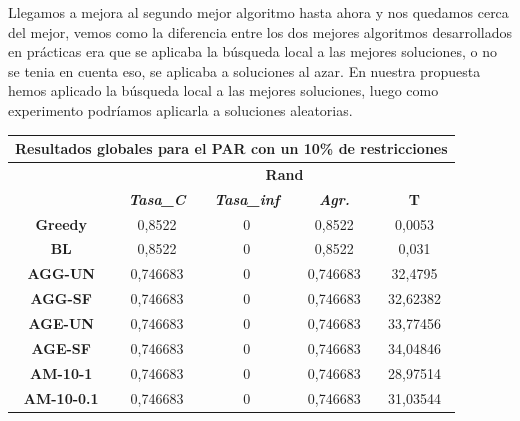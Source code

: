 \documentclass[12pt, spanish]{article}
\begin{document}
Llegamos a mejora al segundo mejor algoritmo hasta ahora y nos quedamos cerca del mejor, vemos como la diferencia entre los dos mejores algoritmos desarrollados en prácticas era que se aplicaba la búsqueda local a las mejores soluciones, o no se tenia en cuenta eso, se aplicaba a soluciones al azar. En nuestra propuesta hemos aplicado la búsqueda local a las mejores soluciones, luego como experimento podríamos aplicarla a soluciones aleatorias.

\begin{table}[H]
\centering
\begin{tabular}{|c|c|c|c|c|}
\hline
\multicolumn{5}{|c|}{\textbf{Resultados globales para el PAR con un 10\% de restricciones}}                                 \\ \hline
\multirow{2}{*}{}           & \multicolumn{4}{c|}{\textbf{Rand}}                                                            \\ \cline{2-5} 
                            & \textit{\textbf{Tasa\_C}} & \textit{\textbf{Tasa\_inf}} & \textit{\textbf{Agr.}} & \textbf{T} \\ \hline
\textbf{Greedy}             & 0,8522                    & 0                           & 0,8522                 & 0,0053     \\ \hline
\textbf{BL}                 & 0,8522                    & 0                           & 0,8522                 & 0,031      \\ \hline
\textbf{AGG-UN}             & 0,746683                  & 0                           & 0,746683               & 32,4795    \\ \hline
\textbf{AGG-SF}             & 0,746683                  & 0                           & 0,746683               & 32,62382   \\ \hline
\textbf{AGE-UN}             & 0,746683                  & 0                           & 0,746683               & 33,77456   \\ \hline
\textbf{AGE-SF}             & 0,746683                  & 0                           & 0,746683               & 34,04846   \\ \hline
\textbf{AM-10-1}            & 0,746683                  & 0                           & 0,746683               & 28,97514   \\ \hline
\textbf{AM-10-0.1}          & 0,746683                  & 0                           & 0,746683               & 31,03544   \\ \hline

\end{tabular}
\end{table}
\end{document}
